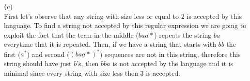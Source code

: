\documentclass[11pt]{article}
\renewcommand{\part}[1] {{\vspace{0.15in}\noindent\textbf (#1)} \vspace{0.10in}}
\begin{document}
\part{c} \\
First let's observe that any string with size less or equal to $2$ is accepted by this language.
To find a string not accepted by this regular expression we are going to exploit the fact that the term in the middle ($baa*$) repeats the string $ba$ everytime that it is repeated.
Then, if we have a string that starts with $bb$ the first ($a^*$) and second ($(baa*)^*$) sequences are not in this string, therefore this string should have just $b$'s, then $bba$ is not accepted by the language and it is minimal since every string with size less then $3$ is accepted.
\end{document}
